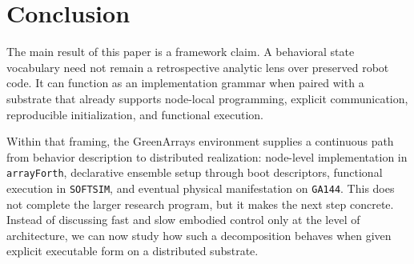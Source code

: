 \documentclass[11pt]{article}
\begin{document}
\section{Conclusion}

The main result of this paper is a framework claim. A behavioral state
vocabulary need not remain a retrospective analytic lens over preserved robot
code. It can function as an implementation grammar when paired with a
substrate that already supports node-local programming, explicit
communication, reproducible initialization, and functional execution.

Within that framing, the GreenArrays environment supplies a continuous path
from behavior description to distributed realization: node-level
implementation in \texttt{arrayForth}, declarative ensemble setup through
boot descriptors, functional execution in \texttt{SOFTSIM}, and eventual
physical manifestation on \texttt{GA144}. This does not complete the larger
research program, but it makes the next step concrete. Instead of discussing
fast and slow embodied control only at the level of architecture, we can now
study how such a decomposition behaves when given explicit executable form on
a distributed substrate.



\end{document}
